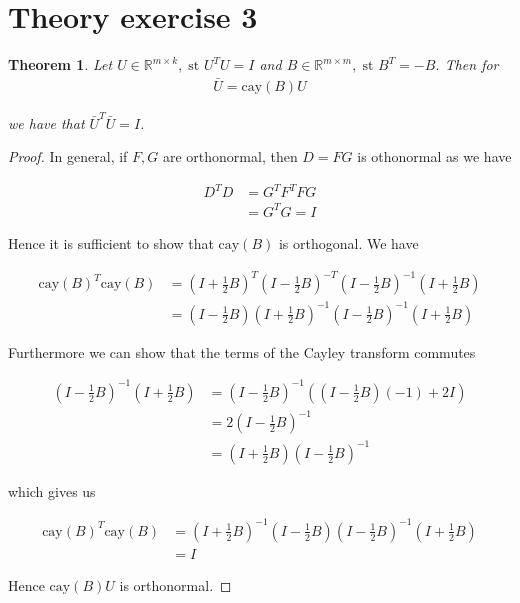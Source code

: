 \documentclass[11pt,a4paper,english]{elsarticle}%
\newtheorem{theorem}{Theorem}
\begin{document}
\section{Theory exercise 3}

\begin{theorem}
  Let $U \in \mathbb{R}^{m \times k}, \; \text{st } U^TU = I$ and $B \in \mathbb{R}^{m\times m}, \; \text{st } B^T = -B$. Then for
\begin{align*}
  \bar U = \text{cay}(B)U
\end{align*}

\noindent we have that $\bar U^T \bar U = I$. 
\end{theorem}

\begin{proof}
  In general, if $F,G$ are orthonormal, then $D = FG$ is othonormal as we have

  \begin{align*}
    D^TD &= G^TF^TFG \\
    &= G^TG = I
  \end{align*}

  Hence it is sufficient to show that $\text{cay}(B)$ is orthogonal. We have

  \begin{align*}
    \text{cay}(B)^T\text{cay}(B) &=  (I+\frac{1}{2}B)^T(I-\frac{1}{2}B)^{-T}(I-\frac{1}{2}B)^{-1}(I+\frac{1}{2}B)\\
    &= (I-\frac{1}{2}B)(I+\frac{1}{2}B)^{-1}(I-\frac{1}{2}B)^{-1}(I+\frac{1}{2}B)
  \end{align*}

  Furthermore we can show that the terms of the Cayley transform commutes

  \begin{align*}
    (I-\frac{1}{2}B)^{-1}(I+\frac{1}{2}B) &= (I-\frac{1}{2}B)^{-1}((I-\frac{1}{2}B)(-1) + 2I)\\
    &= 2(I-\frac{1}{2}B)^{-1} \\
    &= (I+\frac{1}{2}B)(I-\frac{1}{2}B)^{-1}
  \end{align*}

  which gives us 

  \begin{align*}
    \text{cay}(B)^T\text{cay}(B) &=  (I+\frac{1}{2}B)^{-1}(I-\frac{1}{2}B)(I-\frac{1}{2}B)^{-1}(I+\frac{1}{2}B)\\
    &= I
  \end{align*}

Hence $\text{cay}(B)U$ is orthonormal.

\end{proof}
\end{document}

